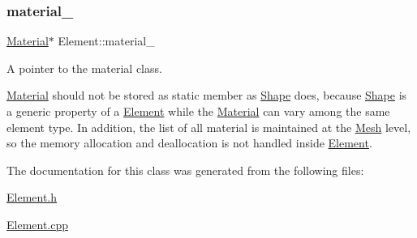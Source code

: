 \subsubsection{\texorpdfstring{material\+\_\+}{material\_}}
{\footnotesize\ttfamily \mbox{\hyperlink{class_material}{Material}}$\ast$ Element\+::material\+\_\+\hspace{0.3cm}{\ttfamily [protected]}}



A pointer to the material class. 

\mbox{\hyperlink{class_material}{Material}} should not be stored as static member as \mbox{\hyperlink{class_shape}{Shape}} does, because \mbox{\hyperlink{class_shape}{Shape}} is a generic property of a \mbox{\hyperlink{class_element}{Element}} while the \mbox{\hyperlink{class_material}{Material}} can vary among the same element type. In addition, the list of all material is maintained at the \mbox{\hyperlink{class_mesh}{Mesh}} level, so the memory allocation and deallocation is not handled inside \mbox{\hyperlink{class_element}{Element}}. 

The documentation for this class was generated from the following files\+:\begin{DoxyCompactItemize}
\item 
\mbox{\hyperlink{_element_8h}{Element.\+h}}\item 
\mbox{\hyperlink{_element_8cpp}{Element.\+cpp}}\end{DoxyCompactItemize}
